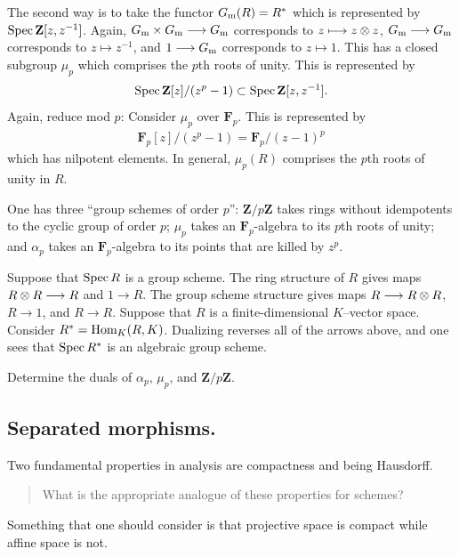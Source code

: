 \documentclass [11 pt, oneside] {article}
\begin{document}
The second way is to take the functor $G\textsubscript{m}(R)=R^*$ which is represented by $\operatorname{Spec} \mathbf{Z}[z,z^{-1}]$. Again, $G\textsubscript{m}\times G\textsubscript{m}\longrightarrow G\textsubscript{m}$ corresponds to $z\longmapsto z\otimes z$, $G\textsubscript{m}\longrightarrow G\textsubscript{m}$ corresponds to $z\longmapsto z^{-1}$, and $1\longrightarrow G\textsubscript{m}$ corresponds to $z\longmapsto 1$.
This has a closed subgroup $\mu_p$ which comprises the $p$th roots of unity. This is represented by
\begin{align*}
	\operatorname{Spec} \mathbf{Z}[z]/(z^p-1) \subset \operatorname{Spec} \mathbf{Z}[z,z^{-1}].
\end{align*}
Again, reduce mod $p$: Consider $\mu_p$ over $\mathbf{F}_{p}$. This is represented by
\begin{align*}
	\mathbf{F}_{p}[z]/(z^p-1) =  \mathbf{F}_{p}/(z-1) ^p
\end{align*}
which has nilpotent elements. 
In general, $\mu_p(R)$ comprises the $p$th roots of unity in $R$.

One has three ``group schemes of order $p$'': $\mathbf{Z}/p\mathbf{Z}$ takes rings without idempotents to the cyclic group of order $p$; $\mu_p$ takes an $\mathbf{F}_{p}$-algebra to its $p$th roots of unity; and $\alpha_p$ takes an $\mathbf{F}_{p}$-algebra to its points that are killed by $z^p$.

\begin{exercise}\label{cduality}\text{}
Suppose that $\operatorname{Spec} R$ is a group scheme. The ring structure of $R$ gives maps $R\otimes R\longrightarrow R$ and $1\longrightarrow R$. The group scheme structure gives maps $R\longrightarrow R\otimes R$, $R\longrightarrow 1$, and $R\longrightarrow R$. 
Suppose that $R$ is a finite-dimensional $K$--vector space. Consider $R^* = \operatorname{Hom}_{K}(R, K)$. Dualizing reverses all of the arrows above, and one sees that $\operatorname{Spec} R^*$ is an algebraic group scheme.

Determine the duals of $\alpha_p$, $\mu_p$, and $\mathbf{Z}/p\mathbf{Z}$.
\end{exercise}

\subsection{Separated morphisms.}
Two fundamental properties in analysis are compactness and being Hausdorff. 
\begin{quote}
	\small What is the appropriate analogue of these properties for schemes?
\end{quote}
Something that one should consider is that projective space is compact while affine space is not.
\end{document}

